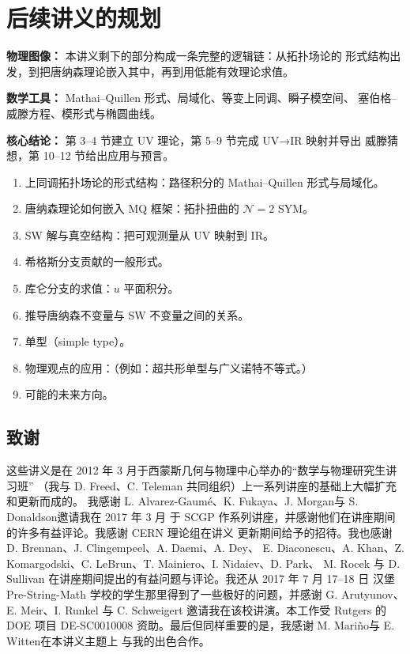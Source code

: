 
\section{后续讲义的规划}

\begin{keytakeaways}
\item \textbf{物理图像：} 本讲义剩下的部分构成一条完整的逻辑链：从拓扑场论的
      形式结构出发，到把唐纳森理论嵌入其中，再到用低能有效理论求值。
\item \textbf{数学工具：} Mathai--Quillen 形式、局域化、等变上同调、瞬子模空间、
      塞伯格--威滕方程、模形式与椭圆曲线。
\item \textbf{核心结论：} 第 3--4 节建立 UV 理论，第 5--9 节完成 UV→IR 映射并导出
      威滕猜想，第 10--12 节给出应用与预言。
\end{keytakeaways}

\begin{enumerate}[leftmargin=2.2em, itemsep=2pt]
\item 上同调拓扑场论的形式结构：路径积分的 Mathai--Quillen 形式与局域化。
\item 唐纳森理论如何嵌入 MQ 框架：拓扑扭曲的 $\mathcal{N}=2$ SYM。
\item SW 解与真空结构：把可观测量从 UV 映射到 IR。
\item 希格斯分支贡献的一般形式。
\item 库仑分支的求值：$u$ 平面积分。
\item 推导唐纳森不变量与 SW 不变量之间的关系。
\item 单型（simple type）。
\item 物理观点的应用：（例如：超共形单型与广义诺特不等式。）
\item 可能的未来方向。
\end{enumerate}

\subsection{致谢}


这些讲义是在 2012 年 3 月于西蒙斯几何与物理中心举办的“数学与物理研究生讲习班”
（我与 D. Freed、C. Teleman 共同组织）上一系列讲座的基础上大幅扩充和更新而成的。
我感谢 L. Alvarez-Gaumé、K. Fukaya、J. Morgan与 S. Donaldson邀请我在 2017 年 3 月
于 SCGP 作系列讲座，并感谢他们在讲座期间的许多有益评论。我感谢 CERN 理论组在讲义
更新期间给予的招待。我也感谢 D. Brennan、J. Clingempeel、A. Daemi、A. Dey、
E. Diaconescu、A. Khan、Z. Komargodski、C. LeBrun、T. Mainiero、I. Nidaiev、D. Park、
M. Rocek 与 D. Sullivan 在讲座期间提出的有益问题与评论。我还从 2017 年 7 月 17--18 日
汉堡 Pre-String-Math 学校的学生那里得到了一些极好的问题，并感谢 G. Arutyunov、
E. Meir、I. Runkel 与 C. Schweigert 邀请我在该校讲演。本工作受 Rutgers 的 DOE 项目
DE-SC0010008 资助。最后但同样重要的是，我感谢 M. Mariño与 E. Witten在本讲义主题上
与我的出色合作。
